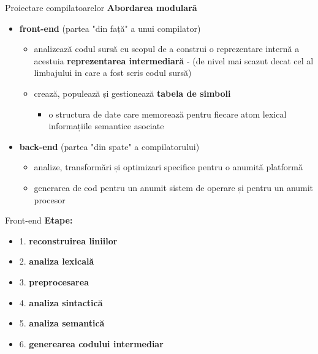 \documentclass[pdf]{beamer}
\begin{document}
\begin{frame}{Proiectare compilatoarelor}
\textbf{Abordarea modulară}
\begin{itemize}
\item
\textbf{front-end} (partea "din față" a unui compilator)

\begin{itemize}
\item
analizează codul sursă cu scopul de a construi o reprezentare internă a acestuia \textbf{reprezentarea intermediară} - (de nivel mai scazut decat cel al limbajului in care a fost scris codul sursă)
\item
crează, populează și gestionează \textbf{tabela de simboli}

\begin{itemize}
\item
o structura de date care memorează pentru fiecare atom lexical informațiile semantice asociate
\end{itemize}

\end{itemize}

\item
\textbf{back-end} (partea "din spate" a compilatorului)

\begin{itemize}
\item
analize, transformări și optimizari specifice pentru o anumită platformă
\item
generarea de cod pentru un anumit sistem de operare și pentru un anumit procesor
\end{itemize}
\end{itemize}
\end{frame}



\begin{frame}{Front-end}
\textbf{Etape:}
\begin{itemize}
\item 
1. \textbf{reconstruirea liniilor}
\item
2. \textbf{analiza lexicală}
\item
3. \textbf{preprocesarea}
\item
4. \textbf{analiza sintactică}
\item
5. \textbf{analiza semantică}
\item
6. \textbf{generearea codului intermediar}
\end{itemize}
\end{frame}
\end{document}
